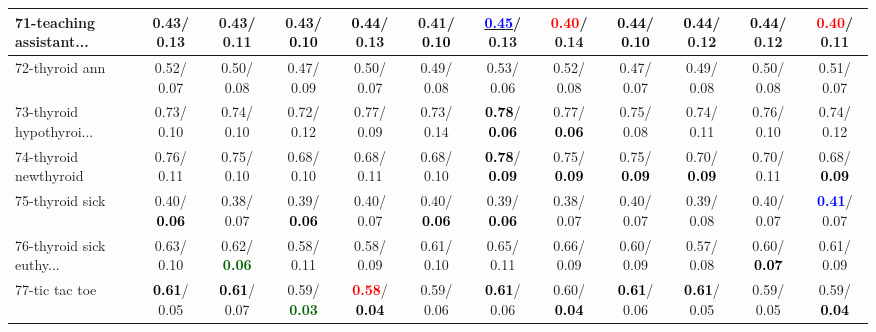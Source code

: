 \begin{table}[h]
\begin{center}
{\begin{tabular}{lc|c|c|c|c|c|c|c|c|c|c}
71-teaching assistant... &   0.43/  0.13 &   0.43/  0.11 &   0.43/\textcolor{black}{\textbf{  0.10}} & \textcolor{black}{\textbf{  0.44}}/  0.13 &   0.41/\textcolor{black}{\textbf{  0.10}} & \underline{\textcolor{blue}{\textbf{  0.45}}}/  0.13 & \textcolor{red}{\textbf{  0.40}}/  0.14 & \textcolor{black}{\textbf{  0.44}}/\textcolor{black}{\textbf{  0.10}} & \textcolor{black}{\textbf{  0.44}}/  0.12 & \textcolor{black}{\textbf{  0.44}}/  0.12 & \textcolor{red}{\textbf{  0.40}}/  0.11 \\ \hline
72-thyroid ann &   0.52/  0.07 &   0.50/  0.08 &   0.47/  0.09 &   0.50/  0.07 &   0.49/  0.08 &   0.53/  0.06 &   0.52/  0.08 &   0.47/  0.07 &   0.49/  0.08 &   0.50/  0.08 &   0.51/  0.07 \\
73-thyroid hypothyroi... &   0.73/  0.10 &   0.74/  0.10 &   0.72/  0.12 &   0.77/  0.09 &   0.73/  0.14 & \textcolor{black}{\textbf{  0.78}}/\textcolor{black}{\textbf{  0.06}} &   0.77/\textcolor{black}{\textbf{  0.06}} &   0.75/  0.08 &   0.74/  0.11 &   0.76/  0.10 &   0.74/  0.12 \\
74-thyroid newthyroid &   0.76/  0.11 &   0.75/  0.10 &   0.68/  0.10 &   0.68/  0.11 &   0.68/  0.10 & \textcolor{black}{\textbf{  0.78}}/\textcolor{black}{\textbf{  0.09}} &   0.75/\textcolor{black}{\textbf{  0.09}} &   0.75/\textcolor{black}{\textbf{  0.09}} &   0.70/\textcolor{black}{\textbf{  0.09}} &   0.70/  0.11 &   0.68/\textcolor{black}{\textbf{  0.09}} \\
75-thyroid sick &   0.40/\textcolor{black}{\textbf{  0.06}} &   0.38/  0.07 &   0.39/\textcolor{black}{\textbf{  0.06}} &   0.40/  0.07 &   0.40/\textcolor{black}{\textbf{  0.06}} &   0.39/\textcolor{black}{\textbf{  0.06}} &   0.38/  0.07 &   0.40/  0.07 &   0.39/  0.08 &   0.40/  0.07 & \textcolor{blue}{\textbf{  0.41}}/  0.07 \\
76-thyroid sick euthy... &   0.63/  0.10 &   0.62/\textcolor{darkgreen}{\textbf{  0.06}} &   0.58/  0.11 &   0.58/  0.09 &   0.61/  0.10 &   0.65/  0.11 &   0.66/  0.09 &   0.60/  0.09 &   0.57/  0.08 &   0.60/\textcolor{black}{\textbf{  0.07}} &   0.61/  0.09 \\
77-tic tac toe & \textcolor{black}{\textbf{  0.61}}/  0.05 & \textcolor{black}{\textbf{  0.61}}/  0.07 &   0.59/\textcolor{darkgreen}{\textbf{  0.03}} & \textcolor{red}{\textbf{  0.58}}/\textcolor{black}{\textbf{  0.04}} &   0.59/  0.06 & \textcolor{black}{\textbf{  0.61}}/  0.06 &   0.60/\textcolor{black}{\textbf{  0.04}} & \textcolor{black}{\textbf{  0.61}}/  0.06 & \textcolor{black}{\textbf{  0.61}}/  0.05 &   0.59/  0.05 &   0.59/\textcolor{black}{\textbf{  0.04}} \\

\end{tabular}}
\end{center}
\end{table}
